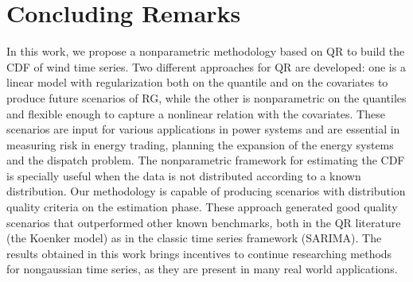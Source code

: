\section{Concluding Remarks}

In this work, we propose a nonparametric methodology based on QR to build the CDF of wind time series.  Two different approaches for QR are developed: one is a linear model with regularization both on the quantile and on the covariates to produce future scenarios of RG, while the other is nonparametric on the quantiles and flexible enough to capture a nonlinear relation with the covariates. These scenarios are input for various applications in power systems and are essential in measuring risk in energy trading, planning the expansion of the energy systems and the dispatch problem. The nonparametric framework for estimating the CDF is specially useful when the data is not distributed according to a known distribution. 
Our methodology is capable of producing scenarios with distribution quality criteria on the estimation phase.  
These approach generated good quality scenarios that outperformed other known benchmarks, both in the QR literature (the Koenker model) as in the classic time series framework (SARIMA). 
The results obtained in this work brings incentives to continue researching methods for nongaussian time series, as they are present in many real world applications. 